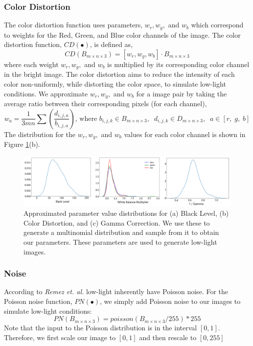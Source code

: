 \documentclass{article}
\begin{document}
\subsubsection{Color Distortion}
The color distortion function uses parameters, \(w_r, w_g,\) and \(w_b\) which correspond to weights for the Red, Green, and Blue color channels of the image. The color distortion function, $CD(\bullet)$, is defined as, 
$$CD(B_{m\times n\times 3}) = [w_r, w_g, w_b] \cdot B_{m\times n\times 3}$$
where each weight \(w_r, w_g,\) and \(w_b\) is multiplied by its corresponding color channel in the bright image. The color distortion aims to reduce the intensity of each color non-uniformly, while distorting the color space, to simulate low-light conditions. We approximate \(w_r, w_g,\) and \(w_b\)  for a image pair by taking the average ratio between their corresponding pixels (for each channel), 
$$w_a = \frac{1}{3mn}\sum{(\frac{d_{i, j, a}}{b_{i, j, a}})} \text{, where }b_{i, j, k} \in B_{m\times n\times 3},\;\; d_{i, j, k} \in D_{m\times n\times 3}, \;\; a \in [r,\; g,\; b]$$
The distribution for the \(w_r, w_g,\) and \(w_b\) values for each color channel is shown in Figure \ref{fig:simulation variables}(b). 

\begin{figure}[t!]
  \centering
  \includegraphics[scale=0.5]{Distributions}
  \caption{Approximated parameter value distributions for (a) Black Level, (b) Color Distortion, and (c) Gamma Correction. We use these to generate a multinomial distribution and sample from it to obtain our parameters. These parameters are used to generate low-light images.}
  \label{fig:simulation variables}
\end{figure}

\subsubsection{Noise}
According to \textit{Remez et. al.} \cite{remez2017deep} low-light inherently have Poisson noise. For the Poisson noise function, $PN(\bullet)$, we simply add Poisson noise to our images to simulate low-light conditions:
$$PN(B_{m\times n\times 3}) = poisson(B_{m\times n\times 3}/255)*255$$
Note that the input to the Poisson distribution is in the interval \([0, 1]\). Therefore, we first scale our image to \([0, 1]\) and then rescale to \([0, 255]\)
\end{document}
